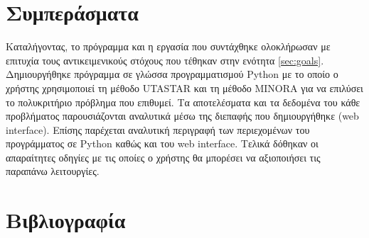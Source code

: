 \documentclass[11pt,a4paper,titlepage]{article}
\numberwithin{equation}{section}
\begin{document}
\section{Συμπεράσματα}
\label{sec:conclusion}
Καταλήγοντας, το πρόγραμμα και η εργασία που συντάχθηκε ολοκλήρωσαν με επιτυχία τους αντικειμενικούς στόχους που τέθηκαν στην ενότητα \ref{sec:goals}. Δημιουργήθηκε πρόγραμμα σε γλώσσα προγραμματισμού Python με το οποίο ο χρήστης χρησιμοποιεί τη μέθοδο UTASTAR και τη μέθοδο MINORA για να επιλύσει το πολυκριτήριο πρόβλημα που επιθυμεί. Τα αποτελέσματα και τα δεδομένα του κάθε προβλήματος παρουσιάζονται αναλυτικά μέσω της διεπαφής που δημιουργήθηκε (web interface). Επίσης παρέχεται αναλυτική περιγραφή των περιεχομένων του προγράμματος σε Python καθώς και του web interface. Τελικά δόθηκαν οι απαραίτητες οδηγίες με τις οποίες ο χρήστης θα μπορέσει να αξιοποιήσει τις παραπάνω λειτουργίες.

\section{Βιβλιογραφία}
\label{sec:bibliography}
\nocite{utastar-lecture}
\nocite{utastar-book}

\printbibliography
\end{document}
